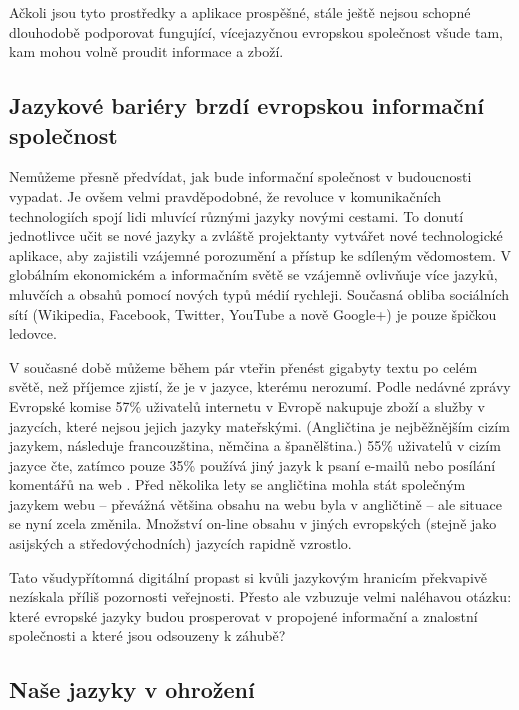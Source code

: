 \begin{multicols}{2}
Ačkoli jsou tyto prostředky a aplikace prospěšné, stále ještě nejsou schopné dlouhodobě podporovat fungující, vícejazyčnou evropskou společnost všude tam, kam mohou volně proudit informace a zboží.

\subsection{Jazykové bariéry brzdí evropskou informační společnost}

Nemůžeme přesně předvídat, jak bude informační společnost v budoucnosti vypadat. Je ovšem velmi pravděpodobné, že revoluce v komunikačních technologiích spojí lidi mluvící různými jazyky novými cestami. To donutí jednotlivce učit se nové jazyky a zvláště projektanty vytvářet nové technologické aplikace, aby zajistili vzájemné porozumění a přístup ke sdíleným vědomostem. V globálním ekonomickém a informačním světě se vzájemně ovlivňuje více jazyků, mluvčích a obsahů pomocí nových typů médií rychleji. Současná obliba sociálních sítí (Wikipedia, Facebook, Twitter, YouTube a nově Google+) je pouze špičkou ledovce.


V současné době můžeme během pár vteřin přenést gigabyty textu po celém světě, než příjemce zjistí, že je v jazyce, kterému nerozumí. Podle nedávné zprávy Evropské komise 57\% uživatelů internetu v Evropě nakupuje zboží a služby v jazycích, které nejsou jejich jazyky mateřskými. (Angličtina je nejběžnějším cizím jazykem, následuje francouzština, němčina a španělština.) 55\% uživatelů v cizím jazyce čte, zatímco pouze 35\% používá jiný jazyk k psaní e-mailů nebo posílání komentářů na web \cite{EC1}. Před několika lety se angličtina mohla stát společným jazykem webu – převážná většina obsahu na webu byla v angličtině – ale situace se nyní zcela změnila. Množství on-line obsahu v jiných evropských (stejně jako asijských a středovýchodních) jazycích rapidně vzrostlo.

Tato všudypřítomná digitální propast si kvůli jazykovým hranicím překvapivě nezískala příliš pozornosti veřejnosti. Přesto ale vzbuzuje velmi naléhavou otázku: které evropské jazyky budou prosperovat v propojené informační a znalostní společnosti a které jsou odsouzeny k záhubě?

\subsection{Naše jazyky v ohrožení}


\end{multicols}
